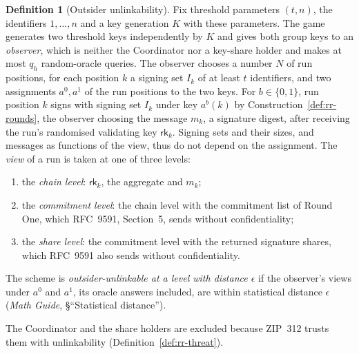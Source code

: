 \documentclass[11pt,a4paper]{article}
\theoremstyle{definition}
\newtheorem{definition}[theorem]{Definition}
\newcommand{\rk}{\mathsf{rk}}
\begin{document}
\begin{definition}[Outsider unlinkability]\label{def:outsider-unlink}
Fix threshold parameters \((t, n)\), the identifiers \(1, \dots, n\) and a
key generation \(K\) with these parameters. The game generates two threshold
keys independently by \(K\) and gives both group keys to an \emph{observer},
which is neither the Coordinator nor a key-share holder and makes at most
\(q_h\) random-oracle queries. The observer chooses a number \(N\) of run
positions, for each position \(k\) a signing set \(I_k\) of at least \(t\)
identifiers, and two assignments \(a^0, a^1\) of the run positions to the
two keys. For \(b \in \{0, 1\}\), run position \(k\) signs with signing set
\(I_k\) under key \(a^b(k)\) by Construction~\ref{def:rr-rounds}, the
observer choosing the message \(m_k\), a signature digest, after receiving
the run's randomised validating key \(\rk_k\). Signing sets and their sizes,
and messages as functions of the view, thus do not depend on the
assignment. The \emph{view} of a run is taken at one of three levels:
\begin{enumerate}
\item[] the \emph{chain level}: \(\rk_k\), the aggregate and \(m_k\);
\item[] the \emph{commitment level}: the chain level with the commitment
  list of Round One, which RFC~9591, Section~5, sends without
  confidentiality;
\item[] the \emph{share level}: the commitment level with the returned
  signature shares, which RFC~9591 also sends without confidentiality.
\end{enumerate}
The scheme is \emph{outsider-unlinkable at a level with distance
\(\epsilon\)} if the observer's views under \(a^0\) and \(a^1\), its oracle
answers included, are within statistical distance \(\epsilon\) (\emph{Math
Guide}, \S``Statistical distance'').
\end{definition}

The Coordinator and the share holders are excluded because ZIP~312 trusts
them with unlinkability (Definition~\ref{def:rr-threat}).
\end{document}
